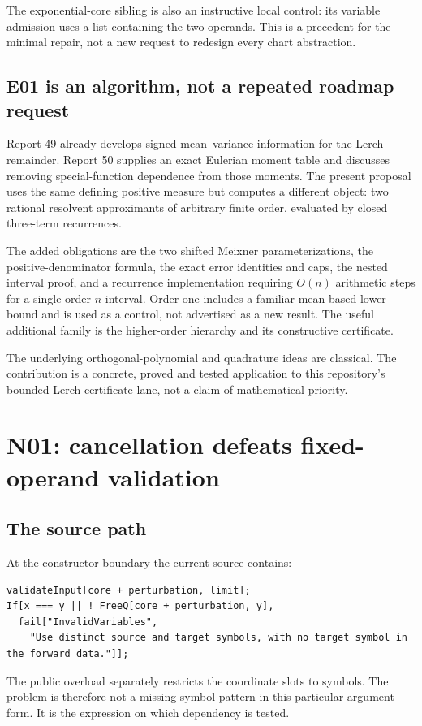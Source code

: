 \documentclass[11pt,a4paper]{article}
\theoremstyle{remark}\newtheorem{remark}[theorem]{Remark}
\begin{document}
The exponential-core sibling is also an instructive local control: its variable
admission uses a list containing the two operands. This is a precedent for the
minimal repair, not a new request to redesign every chart abstraction.
\cite{expcore}

\subsection{E01 is an algorithm, not a repeated roadmap request}

Report 49 already develops signed mean--variance information for the Lerch
remainder. Report 50 supplies an exact Eulerian moment table and discusses
removing special-function dependence from those moments. The present proposal
uses the same defining positive measure but computes a different object:
two rational resolvent approximants of arbitrary finite order, evaluated by
closed three-term recurrences.\cite{r49,r50}

The added obligations are the two shifted Meixner parameterizations, the
positive-denominator formula, the exact error identities and caps, the nested
interval proof, and a recurrence implementation requiring $O(n)$ arithmetic
steps for a single order-$n$ interval. Order one includes a familiar mean-based
lower bound and is used as a control, not advertised as a new result. The useful
additional family is the higher-order hierarchy and its constructive certificate.

The underlying orthogonal-polynomial and quadrature ideas are classical.
The contribution is a concrete, proved and tested application to this
repository's bounded Lerch certificate lane, not a claim of mathematical priority.

\section{N01: cancellation defeats fixed-operand validation}
\label{sec:counterexample}

\subsection{The source path}

At the constructor boundary the current source contains:
\begin{lstlisting}
validateInput[core + perturbation, limit];
If[x === y || ! FreeQ[core + perturbation, y],
  fail["InvalidVariables",
    "Use distinct source and target symbols, with no target symbol in the forward data."]];
\end{lstlisting}
The public overload separately restricts the coordinate slots to symbols.
The problem is therefore not a missing symbol pattern in this particular
argument form. It is the expression on which dependency is tested.\cite{core}
\end{document}
